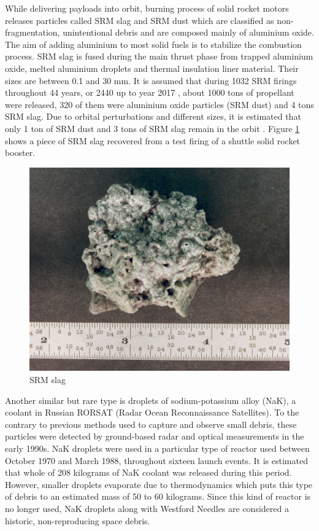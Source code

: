 	While delivering payloads into orbit, burning process of solid rocket motors releases particles called SRM slag and SRM dust which are classified as non-fragmentation, unintentional debris and are composed mainly of aluminium oxide. The aim of adding aluminium to most solid fuels is to stabilize the combustion process. SRM slag is fused during the main thrust phase from trapped aluminium oxide, melted aluminium droplets and thermal insulation liner material. Their sizes are between 0.1 and 30 mm. It is assumed that during 1032 SRM firings throughout 44 years, or 2440 up to year 2017 \citep{esabr336}, about 1000 tons of propellant were released, 320 of them were aluminium oxide particles (SRM dust) and 4 tons SRM slag. Due to orbital perturbations and different sizes, it is estimated that only 1 ton of SRM dust and 3 tons of SRM slag remain in the orbit \citep{klinkrad2006space}. Figure \ref{fig:srmslag} shows a piece of SRM slag recovered from a test firing of a shuttle solid rocket booster.
	
\begin{figure}[H]
  \includegraphics[width=\linewidth]{images/slag}
  \caption{SRM slag}
  \label{fig:srmslag}
\end{figure}	
	
	Another similar but rare type is droplets of sodium-potassium alloy (NaK), a coolant in Russian RORSAT (Radar Ocean Reconnaissance Satellites). To the contrary to previous methods used to capture and observe small debris, these particles were detected by ground-based radar and optical measurements in the early 1990s. NaK droplets were used in a particular type of reactor used between October 1970 and March 1988, throughout sixteen launch events. It is estimated that whole of 208 kilograms of NaK coolant was released during this period. However, smaller droplets evaporate due to thermodynamics which puts this type of debris to an estimated mass of 50 to 60 kilograms. Since this kind of reactor is no longer used, NaK droplets along with Westford Needles are considered a historic, non-reproducing space debris. 
	
